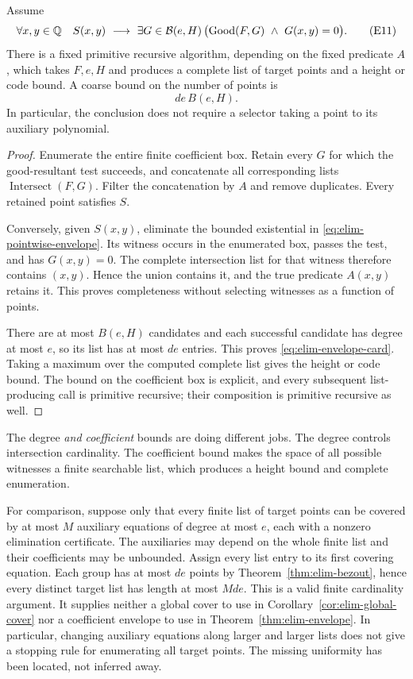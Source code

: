 \begin{theorem}
\label{thm:elim-envelope}
Assume
\[
 \forall x,y\in\Q\quad S(x,y)\ \longrightarrow\
 \exists G\in\mathcal B(e,H)\,
       \bigl(\Good(F,G)\ \wedge\ G(x,y)=0\bigr).
 \tag{E11}\label{eq:elim-pointwise-envelope}
\]
There is a fixed primitive recursive algorithm, depending on the fixed
predicate \(A\), which takes \(F,e,H\) and produces a complete list of
target points and a height or code bound.  A coarse bound on the number
of points is
\[
 d e\, B(e,H).
 \tag{E12}\label{eq:elim-envelope-card}
\]
In particular, the conclusion does not require a selector taking a point
to its auxiliary polynomial.
\end{theorem}

\begin{proof}
Enumerate the entire finite coefficient box.  Retain every \(G\) for
which the good-resultant test succeeds, and concatenate all corresponding
lists \(\operatorname{Intersect}(F,G)\).  Filter the concatenation by
\(A\) and remove duplicates.  Every retained point satisfies \(S\).

Conversely, given \(S(x,y)\), eliminate the bounded existential in
\eqref{eq:elim-pointwise-envelope}.  Its witness occurs in the enumerated
box, passes the test, and has \(G(x,y)=0\).  The complete intersection
list for that witness therefore contains \((x,y)\).  Hence the union
contains it, and the true predicate \(A(x,y)\) retains it.  This proves
completeness without selecting witnesses as a function of points.

There are at most \(B(e,H)\) candidates and each successful candidate
has degree at most \(e\), so its list has at most \(de\) entries.
This proves \eqref{eq:elim-envelope-card}.  Taking a maximum over the
computed complete list gives the height or code bound.  The bound on the
coefficient box is explicit, and every subsequent list-producing call is
primitive recursive; their composition is primitive recursive as well.
\end{proof}

The degree \emph{and coefficient} bounds are doing different jobs.  The
degree controls intersection cardinality.  The coefficient bound makes
the space of all possible witnesses a finite searchable list, which
produces a height bound and complete enumeration.

For comparison, suppose only that every finite list of target points can
be covered by at most \(M\) auxiliary equations of degree at most \(e\),
each with a nonzero elimination certificate.  The auxiliaries may depend
on the whole finite list and their coefficients may be unbounded.
Assign every list entry to its first covering equation.  Each group has
at most \(de\) points by Theorem~\ref{thm:elim-bezout}, hence every
distinct target list has length at most \(Mde\).  This is a valid finite
cardinality argument.  It supplies neither a global cover to use in
Corollary~\ref{cor:elim-global-cover} nor a coefficient envelope to use
in Theorem~\ref{thm:elim-envelope}.  In particular, changing auxiliary
equations along larger and larger lists does not give a stopping rule for
enumerating all target points.  The missing uniformity has been located,
not inferred away.

